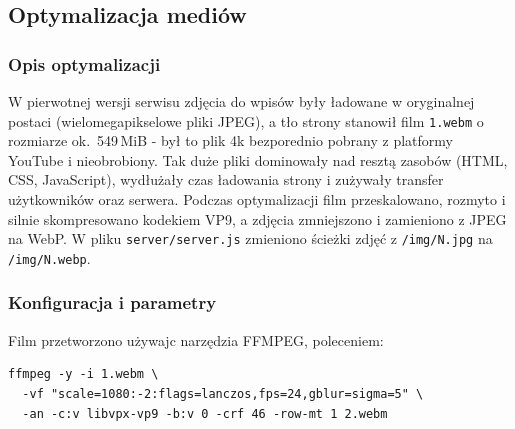 \makeatletter
{}
\makeatother

\subsection{Optymalizacja mediów}
\subsubsection{Opis optymalizacji}

W pierwotnej wersji serwisu zdjęcia do wpisów były ładowane w oryginalnej postaci
(wielomegapikselowe pliki JPEG), a tło strony stanowił film \texttt{1.webm}
o rozmiarze ok.\ 549\,MiB - był to plik 4k bezporednio pobrany z platformy YouTube i nieobrobiony. Tak duże pliki dominowały nad resztą zasobów
(HTML, CSS, JavaScript), wydłużały czas ładowania strony i zużywały transfer
użytkowników oraz serwera. Podczas optymalizacji film przeskalowano, rozmyto i silnie
skompresowano kodekiem VP9, a zdjęcia zmniejszono i zamieniono z JPEG na WebP.
W pliku \texttt{server/server.js} zmieniono ścieżki zdjęć z \texttt{/img/N.jpg}
na \texttt{/img/N.webp}.

\subsubsection{Konfiguracja i parametry}

Film przetworzono używajc narzędzia FFMPEG, poleceniem:

\begin{verbatim}
ffmpeg -y -i 1.webm \
  -vf "scale=1080:-2:flags=lanczos,fps=24,gblur=sigma=5" \
  -an -c:v libvpx-vp9 -b:v 0 -crf 46 -row-mt 1 2.webm
\end{verbatim}

